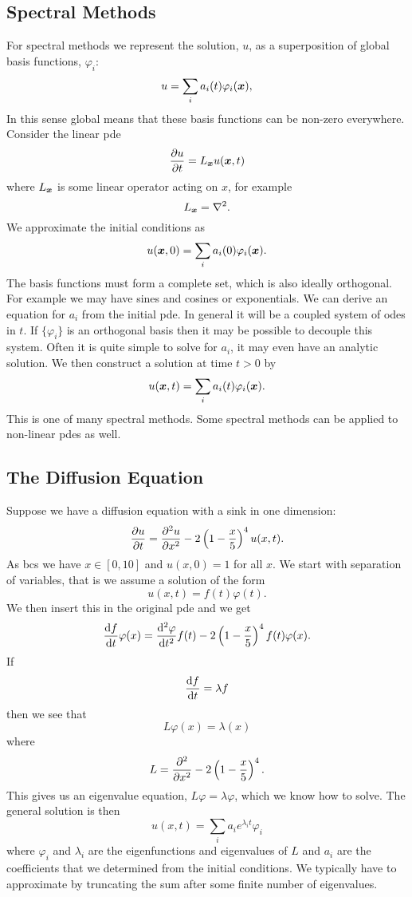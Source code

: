 \documentclass[a4paper]{article}
\begin{document}
    \subsection{Spectral Methods}
    For spectral methods we represent the solution, \(u\), as a superposition of global basis functions, \(\varphi_i\):
    \[u = \sum_i a_i(t)\varphi_i(\bm{x}),\]
    In this sense global means that these basis functions can be non-zero everywhere.
    Consider the linear \gls{pde}
    \[\pdv{u}{t} = L_{\bm{x}}u(\bm{x}, t)\]
    where \(L_{\bm{x}}\) is some linear operator acting on \(x\), for example
    \[L_{\bm{x}} = \nabla^2.\]
    We approximate the initial conditions as
    \[u(\bm{x}, 0) = \sum_{i} a_i(0)\varphi_i(\bm{x}).\]
    The basis functions must form a complete set, which is also ideally orthogonal.
    For example we may have sines and cosines or exponentials.
    We can derive an equation for \(a_i\) from the initial \gls{pde}.
    In general it will be a coupled system of \glspl{ode} in \(t\).
    If \(\{\varphi_i\}\) is an orthogonal basis then it may be possible to decouple this system.
    Often it is quite simple to solve for \(a_i\), it may even have an analytic solution.
    We then construct a solution at time \(t > 0\) by
    \[u(\bm{x}, t) = \sum_{i} a_i(t)\varphi_i(\bm{x}).\]
    This is one of many spectral methods.
    Some spectral methods can be applied to non-linear \glspl{pde} as well.
    
    \subsection{The Diffusion Equation}
    Suppose we have a diffusion equation with a sink in one dimension:
    \[\pdv{u}{t} = \pdv[2]{u}{x} - 2\left(1 - \frac{x}{5}\right)^4 u(x, t).\]
    As \glspl{bc} we have \(x\in[0, 10]\) and \(u(x, 0) = 1\) for all \(x\).
    We start with separation of variables, that is we assume a solution of the form
    \[u(x, t) = f(t)\varphi(t).\]
    We then insert this in the original \gls{pde} and we get
    \[\dv{f}{t}\varphi(x) = \dv[2]{\varphi}{t}f(t) - 2\left(1 - \frac{x}{5}\right)^4f(t)\varphi(x).\]
    If
    \[\dv{f}{t} = \lambda f\]
    then we see that
    \[L\varphi(x) = \lambda(x)\]
    where
    \[L = \pdv[2]{x} - 2\left(1 - \frac{x}{5}\right)^4.\]
    This gives us an eigenvalue equation, \(L\varphi = \lambda\varphi\), which we know how to solve.
    The general solution is then
    \[u(x, t) = \sum_i a_ie^{\lambda_it}\varphi_i\]
    where \(\varphi_i\) and \(\lambda_i\) are the eigenfunctions and eigenvalues of \(L\) and \(a_i\) are the coefficients that we determined from the initial conditions.
    We typically have to approximate by truncating the sum after some finite number of eigenvalues.
    
\end{document}
